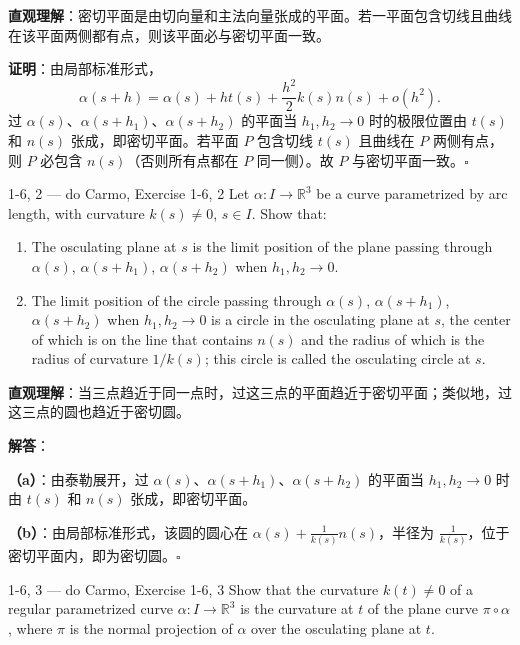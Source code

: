 \begin{solution}
\textbf{直观理解}：密切平面是由切向量和主法向量张成的平面。若一平面包含切线且曲线在该平面两侧都有点，则该平面必与密切平面一致。

\textbf{证明}：由局部标准形式，
\[
\alpha(s+h) = \alpha(s) + ht(s) + \frac{h^2}{2}k(s)n(s) + o(h^2).
\]
过 $\alpha(s)$、$\alpha(s+h_1)$、$\alpha(s+h_2)$ 的平面当 $h_1,h_2\to 0$ 时的极限位置由 $t(s)$ 和 $n(s)$ 张成，即密切平面。若平面 $P$ 包含切线 $t(s)$ 且曲线在 $P$ 两侧有点，则 $P$ 必包含 $n(s)$（否则所有点都在 $P$ 同一侧）。故 $P$ 与密切平面一致。$\square$
\end{solution}

\begin{exercise}{1-6, 2 — do Carmo, Exercise 1-6, 2}
Let $\alpha: I \to \mathbb{R}^3$ be a curve parametrized by arc length, with curvature $k(s) \neq 0$, $s \in I$. Show that:
\begin{enumerate}
\item[a.] The osculating plane at $s$ is the limit position of the plane passing through $\alpha(s)$, $\alpha(s + h_1)$, $\alpha(s + h_2)$ when $h_1, h_2 \to 0$.
\item[b.] The limit position of the circle passing through $\alpha(s)$, $\alpha(s + h_1)$, $\alpha(s + h_2)$ when $h_1, h_2 \to 0$ is a circle in the osculating plane at $s$, the center of which is on the line that contains $n(s)$ and the radius of which is the radius of curvature $1/k(s)$; this circle is called the osculating circle at $s$.
\end{enumerate}
\end{exercise}

\begin{solution}
\textbf{直观理解}：当三点趋近于同一点时，过这三点的平面趋近于密切平面；类似地，过这三点的圆也趋近于密切圆。

\textbf{解答}：

\textbf{（a）}：由泰勒展开，过 $\alpha(s)$、$\alpha(s+h_1)$、$\alpha(s+h_2)$ 的平面当 $h_1,h_2\to 0$ 时由 $t(s)$ 和 $n(s)$ 张成，即密切平面。

\textbf{（b）}：由局部标准形式，该圆的圆心在 $\alpha(s) + \frac{1}{k(s)}n(s)$，半径为 $\frac{1}{k(s)}$，位于密切平面内，即为密切圆。$\square$
\end{solution}

\begin{exercise}{1-6, 3 — do Carmo, Exercise 1-6, 3}
Show that the curvature $k(t) \neq 0$ of a regular parametrized curve $\alpha: I \to \mathbb{R}^3$ is the curvature at $t$ of the plane curve $\pi \circ \alpha$, where $\pi$ is the normal projection of $\alpha$ over the osculating plane at $t$.
\end{exercise}

